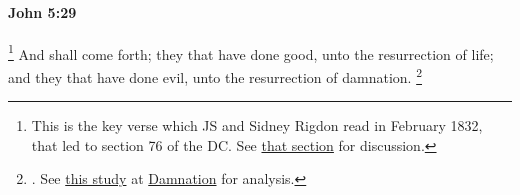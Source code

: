			\begin{framed}
			\scriptsize
				\begin{compactdesc}
					\item[SBLG] 
				\end{compactdesc}
			\end{framed}

		\paragraph{John 5:29} %
			\label{JOHN-5-29}

				\footnote{%
					\label{JOHN-5-29-76}%
					This is the key verse which JS and Sidney Rigdon read in February 1832, that led to section 76 of the DC. See \hyperref[DC76]{that section} for discussion.
					}%
			And shall come forth; they that have done good, unto the resurrection of life; and they that have done evil, unto the resurrection of damnation.%
				\footnote{%
					\label{JOHN-5-29-NOTE-damnation}%
					. See \hyperref[DAMNATION-new-testament]{this study} at \hyperref[DAMNATION]{Damnation} for analysis.
					}

			\begin{framed}
			\scriptsize
				\begin{compactdesc}
					\item[SBLG]  \hyperref[KRISIS]{\grl{κρίσεως}}\gr{.}
				\end{compactdesc}
			\end{framed}

